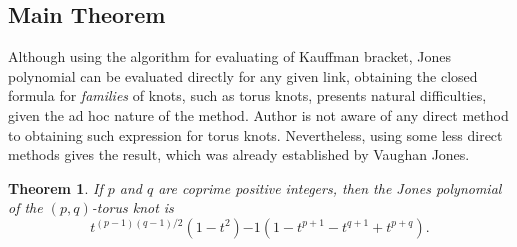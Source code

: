 \documentclass[10pt]{article} %
\newtheorem{theorem}{Theorem}
\theoremstyle{remark}
\begin{document}
\subsection{Main Theorem}\label{JonesOfTorus}
Although using the algorithm for evaluating of Kauffman bracket, Jones polynomial can be evaluated directly for any given link, obtaining
the closed formula for \textit{families} of knots, such as torus knots, presents natural difficulties, given the ad hoc nature of the method.
Author is not aware of any direct method to obtaining such expression for torus knots. Nevertheless, using some less direct methods gives the result,
which was already established by Vaughan Jones.
\begin{theorem}
	If $p$ and $q$ are coprime positive integers, then the Jones polynomial of the $(p,q)$-torus knot is
	\[t^{(p-1)(q-1)/2}(1-t^2){-1}(1-t^{p+1}-t^{q+1}+t^{p+q}).\]
\end{theorem}
\end{document}
